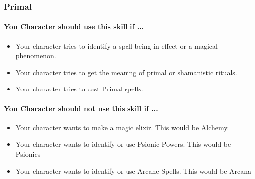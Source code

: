 \begin{multicols}{2}
\subsubsection{Primal}\label{skill:primal}
\paragraph{You Character should use this skill if ...}
\begin{itemize}
    \item Your character tries to identify a spell being in effect or a magical
        phenomenon.
    \item Your character tries to get the meaning of primal or shamanistic rituals.
    \item Your character tries to cast Primal spells.
\end{itemize}
\paragraph{You Character should not use this skill if ...}
\begin{itemize}
    \item Your character wants to make a magic elixir.  This would be Alchemy.
    \item Your character wants to identify or use Psionic Powers. This would be
        Psionics
    \item Your character wants to identify or use Arcane Spells. This would be
        Arcana
\end{itemize}

\end{multicols}
